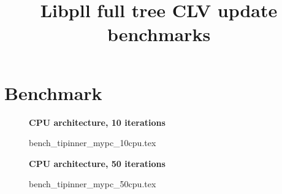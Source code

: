 \documentclass[a4paper]{article}
\begin{document}
\newcommand*{\figuretitle}[1]{%
    {\centering%
    \textbf{#1}%
    \par\medskip}%
}


\title{Libpll full tree CLV update benchmarks}
\maketitle



\section{Benchmark}


\begin{figure}[!htb]
\figuretitle{CPU architecture, 10 iterations}
{bench_tipinner_mypc_10cpu.tex}
\end{figure}


\begin{figure}[!htb]
\figuretitle{CPU architecture, 50 iterations}
{bench_tipinner_mypc_50cpu.tex}
\end{figure}
\end{document}
